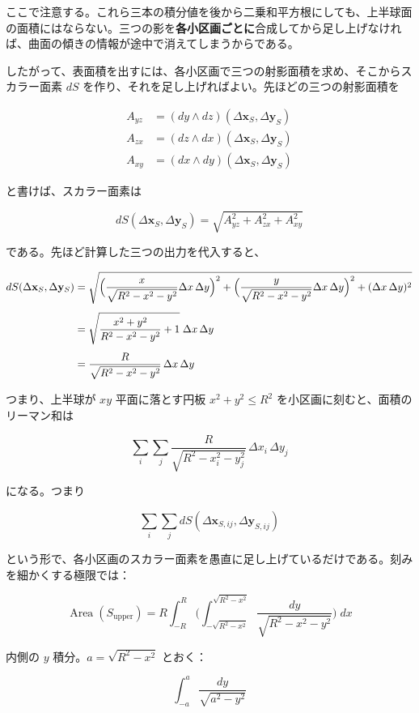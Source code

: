 \documentclass[a4paper,12pt,openany]{book}
\begin{document}
ここで注意する。これら三本の積分値を後から二乗和平方根にしても、上半球面の面積にはならない。三つの影を\textbf{各小区画ごとに}合成してから足し上げなければ、曲面の傾きの情報が途中で消えてしまうからである。

したがって、表面積を出すには、各小区画で三つの射影面積を求め、そこからスカラー面素
\(dS\) を作り、それを足し上げればよい。先ほどの三つの射影面積を

\[\begin{aligned}
A_{yz} &= (dy \wedge dz)(\Delta\mathbf{x}_S,\Delta\mathbf{y}_S) \\
A_{zx} &= (dz \wedge dx)(\Delta\mathbf{x}_S,\Delta\mathbf{y}_S) \\
A_{xy} &= (dx \wedge dy)(\Delta\mathbf{x}_S,\Delta\mathbf{y}_S)
\end{aligned}\]

と書けば、スカラー面素は

\[
dS(\Delta\mathbf{x}_S,\Delta\mathbf{y}_S)
= \sqrt{A_{yz}^2+A_{zx}^2+A_{xy}^2}
\]

である。先ほど計算した三つの出力を代入すると、

\[\begin{aligned}
dS(\Delta\mathbf{x}_S,\Delta\mathbf{y}_S)
&= \sqrt{
\Bigl(\frac{x}{\sqrt{R^2-x^2-y^2}}\Delta x\,\Delta y\Bigr)^2
{}+ \Bigl(\frac{y}{\sqrt{R^2-x^2-y^2}}\Delta x\,\Delta y\Bigr)^2
{}+ (\Delta x\,\Delta y)^2} \\[4pt]
&= \sqrt{\frac{x^2+y^2}{R^2-x^2-y^2}+1}\;\Delta x\,\Delta y \\[4pt]
&= \frac{R}{\sqrt{R^2-x^2-y^2}}\,\Delta x\,\Delta y
\end{aligned}\]

つまり、上半球が \(xy\) 平面に落とす円板 \(x^2+y^2 \le R^2\)
を小区画に刻むと、面積のリーマン和は

\[\sum_i\sum_j
\frac{R}{\sqrt{R^2-x_i^2-y_j^2}}\,
\Delta x_i\,\Delta y_j\]

になる。つまり

\[\sum_i\sum_j dS(\Delta\mathbf{x}_{S,ij},\Delta\mathbf{y}_{S,ij})\]

という形で、各小区画のスカラー面素を愚直に足し上げているだけである。刻みを細かくする極限では：

\[
\operatorname{Area}(S_{\text{upper}})
= R\int_{-R}^{R}\biggl(\int_{-\sqrt{R^2-x^2}}^{\sqrt{R^2-x^2}}
\frac{dy}{\sqrt{R^2 - x^2 - y^2}}\biggr)\;dx
\]

内側の \(y\) 積分。\(a = \sqrt{R^2 - x^2}\) とおく：

\[\int_{-a}^{a} \frac{dy}{\sqrt{a^2 - y^2}}\]
\end{document}
